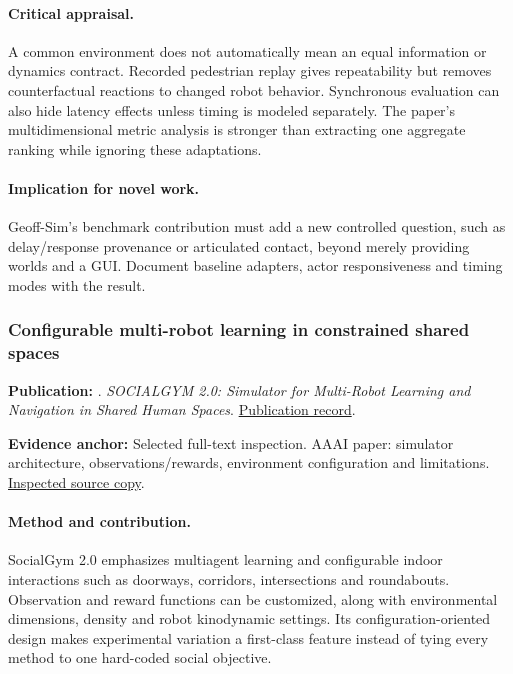 \paragraph{Critical appraisal.} A common environment does not automatically mean an equal information or dynamics contract. Recorded pedestrian replay gives repeatability but removes counterfactual reactions to changed robot behavior. Synchronous evaluation can also hide latency effects unless timing is modeled separately. The paper's multidimensional metric analysis is stronger than extracting one aggregate ranking while ignoring these adaptations.

\paragraph{Implication for novel work.} Geoff-Sim's benchmark contribution must add a new controlled question, such as delay/response provenance or articulated contact, beyond merely providing worlds and a GUI. Document baseline adapters, actor responsiveness and timing modes with the result.

\subsubsection{Configurable multi-robot learning in constrained shared spaces}\label{paper:socialgym}
\textbf{Publication:} \citet{socialgym}. \emph{SOCIALGYM 2.0: Simulator for Multi-Robot Learning and Navigation in Shared Human Spaces}. \href{https://doi.org/10.1609/aaai.v38i21.30562}{Publication record}.

\textbf{Evidence anchor:} Selected full-text inspection. AAAI paper: simulator architecture, observations/rewards, environment configuration and limitations. \href{https://ojs.aaai.org/index.php/AAAI/article/download/30562/32724}{Inspected source copy}.

\paragraph{Method and contribution.} SocialGym 2.0 emphasizes multiagent learning and configurable indoor interactions such as doorways, corridors, intersections and roundabouts. Observation and reward functions can be customized, along with environmental dimensions, density and robot kinodynamic settings. Its configuration-oriented design makes experimental variation a first-class feature instead of tying every method to one hard-coded social objective.

